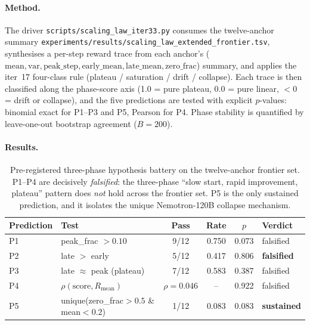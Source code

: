 \documentclass{article}
\begin{document}
\paragraph{Method.}
The driver \texttt{scripts/scaling\_law\_iter33.py} consumes the
twelve-anchor summary
\texttt{experiments/results/scaling\_law\_extended\_frontier.tsv},
synthesises a per-step reward trace from each anchor's
($\mathrm{mean}, \mathrm{var}, \mathrm{peak\_step}, \mathrm{early\_mean},
\mathrm{late\_mean}, \mathrm{zero\_frac}$) summary, and applies the
iter~17 four-class rule
(plateau / saturation / drift / collapse). Each trace is then
classified along the phase-score axis (1.0 = pure plateau, 0.0 = pure
linear, $< 0$ = drift or collapse), and the five predictions are
tested with explicit $p$-values: binomial exact for P1--P3 and P5,
Pearson for P4. Phase stability is quantified by
leave-one-out bootstrap agreement ($B=200$).

\paragraph{Results.}

\begin{table}[t]
\centering\small
\begin{tabular}{llcccl}
\toprule
Prediction & Test & Pass & Rate & $p$ & Verdict \\
\midrule
P1 & peak\_frac $> 0.10$           & 9/12  & 0.750 & 0.073 & falsified \\
P2 & late $>$ early               & 5/12  & 0.417 & 0.806 & \textbf{falsified} \\
P3 & late $\approx$ peak (plateau) & 7/12  & 0.583 & 0.387 & falsified \\
P4 & $\rho(\mathrm{score}, R_{\mathrm{mean}})$ & $\rho{=}0.046$ & -- & 0.922 & falsified \\
P5 & unique(zero\_frac$>0.5$ \& mean$<0.2$) & 1/12 & 0.083 & 0.083 & \textbf{sustained} \\
\bottomrule
\end{tabular}
\caption{Pre-registered three-phase hypothesis battery on the
twelve-anchor frontier set. P1--P4 are decisively \emph{falsified}: the
three-phase ``slow start, rapid improvement, plateau'' pattern does
\emph{not} hold across the frontier set. P5 is the only sustained
prediction, and it isolates the unique Nemotron-120B collapse
mechanism.}
\label{tab:iter33-pred}
\end{table}
\end{document}
